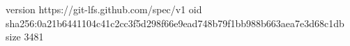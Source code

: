 version https://git-lfs.github.com/spec/v1
oid sha256:0a21b6441104c41c2cc3f5d298f66e9ead748b79f1bb988b663aea7e3d68c1db
size 3481
